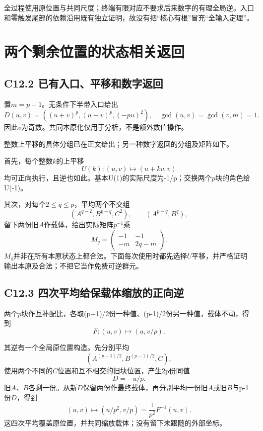 {全过程使用原位置与共同尺度；终端有限对应不要求后来数字的有理全局逆。入口和零触发尾部的依赖沿用既有独立证明，故没有把``核心有根''冒充``全输入定理''。}


\section{两个剩余位置的状态相关返回}\label{construct:r-two}
\subsection*{\texorpdfstring{{C12.2} {已有入口、平移和数字返回}}{C12.2 已有入口、平移和数字返回}}\label{C12-h84}

{置\ensuremath{m=p+1}。无条件下半带入口给出} \[
D(u,v)=((u+v)^p,(u-v)^p,(-pu)^2),
\quad \gcd(u,v)=\gcd(v,m)=1.
\tag{C12.2.1}
\] {因此\ensuremath{v}为奇数。共同本原化仅用于分析，不是额外数值操作。}

{整数上平移的具体分组已在正文给出；另一种数字返回的分组及矩阵如下。}

{首先，每个整数\ensuremath{k}的上平移} \[
U(k):(u,v)\longmapsto(u+kv,v)
\tag{C12.2.2}
\] {均可正向执行，且逆也如此。基本U(1)的实际尺度为-1/p；交换两个\ensuremath{p}块的角色给U(-1)。}

{其次，对每个\ensuremath{2\le q\le p}，平均两个不交组} \[
(A^{q-2},B^{p-q},C^2),\qquad
(A^{p-q},B^q),
\] {留下两份旧\ensuremath{A}作载体，给出实际矩阵\ensuremath{p^{-1}}乘} \[
M_q=\begin{pmatrix}-1&-1\\-m&2q-m\end{pmatrix}.
\tag{C12.2.3}
\] {\ensuremath{M_{q}}并非在所有本原状态上都合法。下面每次使用时都先选择\ensuremath{U}平移，并严格证明输出本原及合法；不把它当作免费可逆群元。}

\subsection*{\texorpdfstring{{C12.3} {四次平均给保载体缩放的正向逆}}{C12.3 四次平均给保载体缩放的正向逆}}\label{C12-h85}

{两个\ensuremath{p}块作互补配比，各取(p+1)/2份一种值、(p-1)/2份另一种值，载体不动，得到} \[
F:(u,v)\longmapsto(u,v/p).
\tag{C12.3.1}
\]

{其逆有一个全局原位置构造。先分别平均} \[
(A^{(p-1)/2},B^{(p-1)/2},C),
\] {使用两个不同的\ensuremath{C}位置和互不相交的旧块位置，产生2p份同值} \[
D=-u/p.
\] {旧\ensuremath{A}、\ensuremath{B}各剩一份。从新\ensuremath{D}保留两份作最终载体，再分别平均一份旧\ensuremath{A}或旧\ensuremath{B}与p-1份\ensuremath{D}，得到} \[
(u,v)\longmapsto(u/p^2,v/p)
=\frac1{p^2}F^{-1}(u,v).
\tag{C12.3.2}
\] {这四次平均覆盖原位置，并共同缩放载体；没有留下未跟随的外部坐标。}

